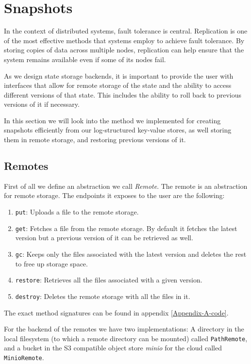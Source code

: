 \section{Snapshots}
\label{section-snapshots}

In the context of distributed systems, fault tolerance is central.
Replication is one of the most effective methods that systems employ to achieve fault tolerance. By storing copies of data across multiple nodes, replication can help ensure that the system remains available even if some of its nodes fail.

As we design state storage backends, it is important to provide the user with interfaces that allow for remote storage of the state and the ability to access different versions of that state. This includes the ability to roll back to previous versions of it if necessary.

In this section we will look into the method we implemented for creating snapshots efficiently from our log-structured key-value stores, as well storing them in remote storage, and restoring previous versions of it.

\subsection{Remotes}

First of all we define an abstraction we call \textit{Remote}.
The remote is an abstraction for remote storage.
The endpoints it exposes to the user are the following:

\begin{enumerate}
    \item \verb|put|: Uploads a file to the remote storage.
    \item \verb|get|: Fetches a file from the remote storage. By default it fetches the latest version but a previous version of it can be retrieved as well.
    \item \verb|gc|: Keeps only the files associated with the latest version and deletes the rest to free up storage space.
    \item \verb|restore|: Retrieves all the files associated with a given version.
    \item \verb|destroy|: Deletes the remote storage with all the files in it.
\end{enumerate}

The exact method signatures can be found in appendix \ref{Appendix-A-code}.

For the backend of the remotes we have two implementations: A directory in the local filesystem (to which a remote directory can be mounted) called \verb|PathRemote|, and a bucket in the S3 compatible object store \textit{minio} for the cloud called \verb|MinioRemote|.

